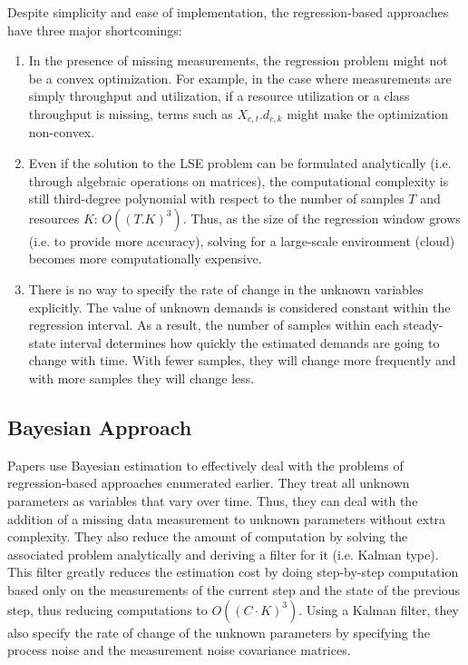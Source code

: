    Despite simplicity and ease of implementation, the regression-based approaches have three major shortcomings:
   \begin{enumerate}
   \item  In the presence of missing measurements, the regression problem might not be a convex optimization. For example, in the case where measurements are simply throughput and utilization, if a resource utilization or a class throughput is missing, terms such as $X_{c,t}.d_{c,k}$ might make the optimization non-convex.   
   \item  Even if the solution to the LSE problem can be formulated analytically (i.e. through algebraic operations on matrices), the computational complexity is still third-degree polynomial with respect to the number of samples $T$ and resources $K$: $O((T.K)^3)$. Thus, as the size of the regression window grows (i.e. to provide more accuracy), solving for a large-scale environment (cloud) becomes more computationally expensive.  
   \item There is no way to specify the rate of change in the unknown variables explicitly. The value of unknown demands is considered constant within the regression interval. As a result, the number of samples within each steady-state interval determines how quickly the estimated demands are going to change with time. With fewer samples, they will change more frequently and with more samples they will change less. 
     \end{enumerate}

    \subsection{Bayesian Approach}   
		Papers \cite{woodside_use_2005,xu_performance_2005,zheng_tracking_2005} use Bayesian estimation to effectively deal with the problems of regression-based approaches enumerated earlier. They treat all unknown parameters as variables that vary over time. Thus, they can deal with the addition of a missing data measurement to unknown parameters without extra complexity. They also reduce the amount of computation by solving the associated problem analytically and deriving a filter for it (i.e. Kalman type). This filter greatly reduces the estimation cost by doing step-by-step computation based only on the measurements of the current step and the state of the previous step, thus reducing computations to $O((C\cdot K)^3)$. Using a Kalman filter, they also specify the rate of change of the unknown parameters by specifying the process noise and the measurement noise covariance matrices. 


